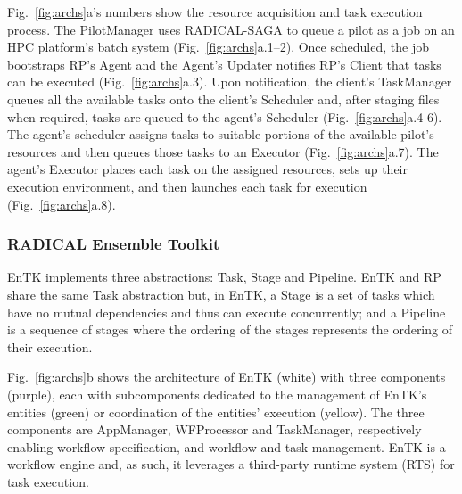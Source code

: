 \documentclass[preprint,12pt, a4paper]{elsarticle}
\begin{document}
Fig.~\ref{fig:archs}a's numbers show the resource acquisition and task execution
process. The PilotManager uses RADICAL-SAGA to queue a pilot as a job on an HPC
platform's batch system (Fig.~\ref{fig:archs}a.1--2). Once scheduled, the job
bootstraps RP's Agent and the Agent's Updater notifies RP's Client that tasks
can be executed (Fig.~\ref{fig:archs}a.3). Upon notification, the client's
TaskManager queues all the available tasks onto the client's Scheduler and,
after staging files when required, tasks are queued to the agent's Scheduler
(Fig.~\ref{fig:archs}a.4-6). The agent's scheduler assigns tasks to suitable
portions of the available pilot's resources and then queues those tasks to an
Executor (Fig.~\ref{fig:archs}a.7). The agent's Executor places each task on the
assigned resources, sets up their execution environment, and then launches each
task for execution (Fig.~\ref{fig:archs}a.8).


\subsubsection{RADICAL Ensemble Toolkit}\label{sssec:arch_entk}

EnTK implements three abstractions: Task, Stage and Pipeline. EnTK and RP share
the same Task abstraction but, in EnTK, a Stage is a set of tasks which have no
mutual dependencies and thus can execute concurrently; and a Pipeline is a
sequence of stages where the ordering of the stages represents the ordering of
their execution.


Fig.~\ref{fig:archs}b shows the architecture of EnTK (white) with three
components (purple), each with subcomponents dedicated to the management of
EnTK's entities (green) or coordination of the entities' execution (yellow). The
three components are AppManager, WFProcessor and TaskManager, respectively
enabling workflow specification, and workflow and task management. EnTK is a
workflow engine and, as such, it leverages a third-party runtime system (RTS)
for task execution.

\end{document}
